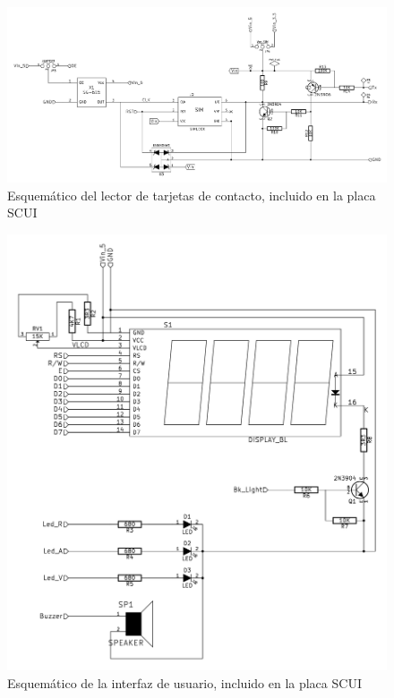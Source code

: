 \begin{figure}[H]
\centering
  \begin{center}
   \includegraphics[angle=90]{Imagenes/scui-lector_smart_card.png}
  \end{center}
  \caption{Esquemático del lector de tarjetas de contacto, incluido en la placa SCUI}\label{Fig:SAM} 
\end{figure}
\begin{figure}[H]
\centering
  \begin{center}
   \includegraphics[scale=1]{Imagenes/scui-interfaz_para_usuario.png}
  \end{center}
  \caption{Esquemático de la interfaz de usuario, incluido en la placa SCUI}\label{Fig:UI} 
\end{figure}

